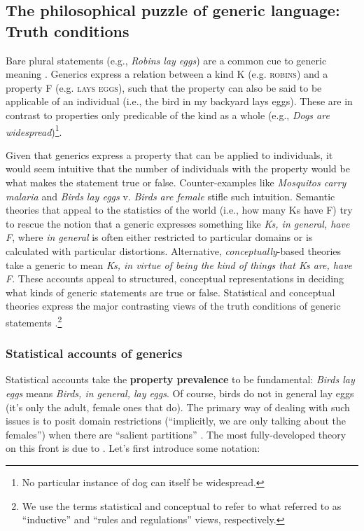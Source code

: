\documentclass[12pt,letterpaper]{article}
\newcommand{\red}[1]{\textcolor{Red}{#1}}
\begin{document}
\subsection*{The philosophical puzzle of generic language: Truth conditions}

Bare plural statements (e.g., \emph{Robins lay eggs}) are a common cue to generic meaning \cite{Carlson1977}.
Generics express a relation between a kind K (e.g. \textsc{robins}) and a property F (e.g. \textsc{lays eggs}), such that the property can also be said to be applicable of an individual (i.e., the bird in my backyard lays eggs).
These are in contrast to properties only predicable of the kind as a whole (e.g., \emph{Dogs are widespread})\footnote{No particular instance of dog can itself be widespread.}.

Given that generics express a property that can be applied to individuals, it would seem intuitive that the number of individuals with the property would be what makes the statement true or false.
Counter-examples like \emph{Mosquitos carry malaria} and \emph{Birds lay eggs} v. \emph{Birds are female} stifle such intuition. 
Semantic theories that appeal to the statistics of the world (i.e., how many Ks have F) try to rescue the notion that a generic expresses something like \emph{Ks, in general, have F}, where \emph{in general} is often either restricted to particular domains or is calculated with particular distortions.
Alternative, \emph{conceptually}-based theories take a generic to mean \emph{Ks, in virtue of being the kind of things that Ks are, have F}.
These accounts appeal to structured, conceptual representations in deciding what kinds of generic statements are true or false.
Statistical and conceptual theories express the major contrasting views of the truth conditions of generic statements \cite{Carlson1995essay}.\footnote{We use the terms statistical and conceptual to refer to what  referred to as ``inductive'' and ``rules and regulations'' views, respectively.}


\subsubsection*{Statistical accounts of generics}

Statistical accounts take the \textbf{property prevalence} to be fundamental: \emph{Birds lay eggs} means \emph{Birds, in general, lay eggs}. 
Of course, birds do not in general lay eggs (it's only the adult, female ones that do).
The primary way of dealing with such issues is to posit domain restrictions (``implicitly, we are only talking about the females'') when there are ``salient partitions'' \cite{Carlson1995}.
The most fully-developed theory on this front is due to . %
Let's first introduce some notation:
\end{document}
